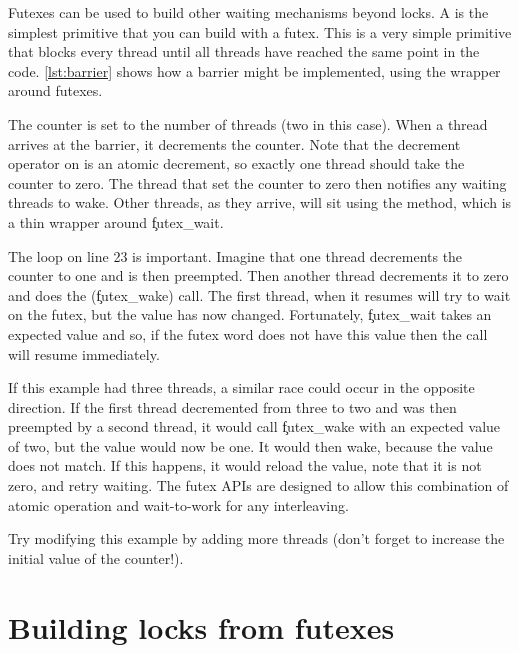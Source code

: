Futexes can be used to build other waiting mechanisms beyond locks.
A  is the simplest primitive that you can build with a futex.
This is a very simple primitive that blocks every thread until all threads have reached the same point in the code.
\ref{lst:barrier} shows how a barrier might be implemented, using the  wrapper around futexes.

\codelisting[filename=examples/barrier/barrier.cc,marker=entry,label=lst:barrier,caption="Implementing a barrier with a futex"]{}

The counter is set to the number of threads (two in this case).
When a thread arrives at the barrier, it decrements the counter.
Note that the decrement operator on  is an atomic decrement, so exactly one thread should take the counter to zero.
The thread that set the counter to zero then notifies any waiting threads to wake.
Other threads, as they arrive, will sit using the  method, which is a thin wrapper around \c{futex_wait}.

The loop on line 23 is important.
Imagine that one thread decrements the counter to one and is then preempted.
Then another thread decrements it to zero and does the  (\c{futex_wake}) call.
The first thread, when it resumes will try to wait on the futex, but the value has now changed.
Fortunately, \c{futex_wait} takes an expected value and so, if the futex word does not have this value then the call will resume immediately.

If this example had three threads, a similar race could occur in the opposite direction.
If the first thread decremented from three to two and was then preempted by a second thread, it would call \c{futex_wake} with an expected value of two, but the value would now be one.
It would then wake, because the value does not match.
If this happens, it would reload the value, note that it is not zero, and retry waiting.
The futex APIs are designed to allow this combination of atomic operation and wait-to-work for any interleaving.

Try modifying this example by adding more threads (don't forget to increase the initial value of the counter!).

\section{Building locks from futexes}

